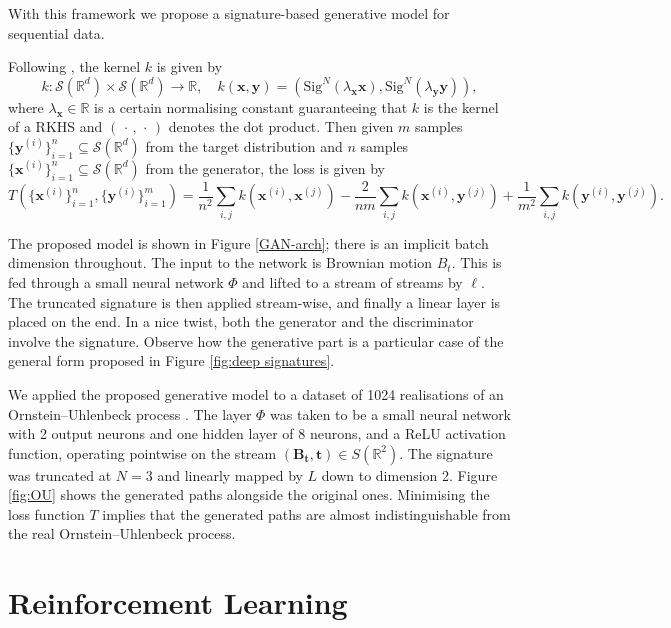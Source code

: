 \documentclass{article}
\theoremstyle{plain}
\theoremstyle{definition}
\begin{document}
With this framework we propose a signature-based generative model for sequential data.

Following \cite{kiraly2016kernels, chevyrev2018signature}, the kernel $k$ is given by
\[ k \colon \mathcal S(\mathbb R^d) \times \mathcal S(\mathbb R^d) \to \mathbb R, \quad k(\mathbf{x},\mathbf{y}) = \left (\mathrm{Sig}^N \left (\lambda_{\mathbf{x}} \mathbf x\right ), \mathrm{Sig}^N\left (\lambda_{\mathbf{y}}\mathbf y\right ) \right ), \]
where $\lambda_{\mathbf x}\in \mathbb R$ is a certain normalising constant guaranteeing that $k$ is the kernel of a RKHS and $(\,\cdot\, , \,\cdot\,)$ denotes the dot product. Then given $m$ samples $\{\mathbf y^{(i)}\}_{i=1}^n \subseteq \mathcal S(\mathbb R^d)$ from the target distribution and $n$ samples $\{\mathbf x^{(i)}\}_{i=1}^n \subseteq \mathcal S(\mathbb R^d)$ from the generator, the loss is given by
\[T\left (\{\mathbf x^{(i)}\}_{i=1}^n, \{\mathbf y^{(i)}\}_{i=1}^m\right ) = \dfrac{1}{n^2}\sum_{i, j} k(\mathbf{x}^{(i)},\mathbf{x}^{(j)}) - \dfrac{2}{nm}\sum_{i, j} k(\mathbf{x}^{(i)},\mathbf{y}^{(j)}) + \dfrac{1}{m^2}\sum_{i, j} k(\mathbf{y}^{(i)},\mathbf{y}^{(j)}).\]

The proposed model is shown in Figure \ref{GAN-arch}; there is an implicit batch dimension throughout. The input to the network is Brownian motion $B_t$. This is fed through a small neural network $\Phi$ and lifted to a stream of streams by $\ell$. The truncated signature is then applied stream-wise, and finally a linear layer is placed on the end. In a nice twist, both the generator and the discriminator involve the signature. Observe how the generative part is a particular case of the general form proposed in Figure \ref{fig:deep signatures}.

We applied the proposed generative model to a dataset of 1024 realisations of an Ornstein--Uhlenbeck process \cite{uhlenbeck1930theory}. The layer $\Phi$ was taken to be a small neural network with 2 output neurons and one hidden layer of 8 neurons, and a ReLU activation function, operating pointwise on the stream $(\mathbf{B_t},\mathbf{t}) \in S(\mathbb R^2)$. The signature was truncated at $N=3$ and linearly mapped by $L$ down to dimension 2. Figure \ref{fig:OU} shows the generated paths alongside the original ones. Minimising the loss function $T$ implies that the generated paths are almost indistinguishable from the real Ornstein--Uhlenbeck process.

\section{Reinforcement Learning}
	
\end{document}
